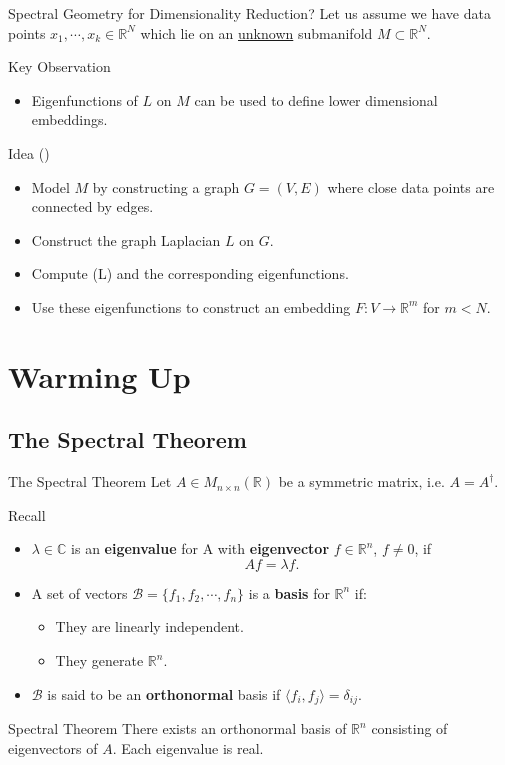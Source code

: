 \documentclass[11pt]{beamer}
\begin{document}
\begin{frame}{Spectral Geometry for Dimensionality Reduction?}
Let us assume we have data points $x_1, \cdots, x_k\in\mathbb{R}^N$ which lie on an \underline{unknown} submanifold $M\subset\mathbb{R}^N$. 
\begin{block}{Key Observation}
\begin{itemize}
\item Eigenfunctions  of $L$ on $M$ can be used to define lower dimensional embeddings.
\end{itemize}
\end{block}

\begin{block}{Idea (\cite{BN2003})}
\begin{itemize}
\item Model $M$ by constructing a graph $G=(V,E)$ where close data points are connected by edges. 
\pause
\item 
Construct the graph Laplacian $L$ on $G$. 
\pause
\item 
Compute (L) and the corresponding eigenfunctions. 
\pause 
\item Use these eigenfunctions to construct an embedding $F:V\longrightarrow \mathbb{R}^m$ for $m<N$. 
\end{itemize}
\end{block}
\end{frame}

\section{Warming Up}

\subsection{The Spectral Theorem}

\begin{frame}{The Spectral Theorem}
Let $A\in M_{n\times n}(\mathbb{R})$ be a symmetric matrix, i.e. $A=A^\dagger$. 
\pause
\begin{block}{Recall}
\begin{itemize}
\item $\lambda\in\mathbb{C}$ is an {\bf eigenvalue} for A with {\bf eigenvector} $f\in\mathbb{R}^n$, $f\neq 0$, if 
$$Af=\lambda f.$$
\item A set of vectors $\mathcal{B} = \{f_1, f_2, \cdots, f_n\}$ is a {\bf basis} for $\mathbb{R}^n$ if:
\begin{itemize}
\item They are linearly independent. 
\item They generate $\mathbb{R}^n$.
\end{itemize}
\item $\mathcal{B}$ is said to be an {\bf orthonormal} basis if $\langle f_i, f_j\rangle = \delta_{ij}$. 
\end{itemize}
\pause 
\end{block}
\begin{block}{Spectral Theorem}
There exists an orthonormal basis of $\mathbb{R}^n$ consisting of eigenvectors of $A$. Each eigenvalue is real.
\end{block}
\end{frame}
\end{document}
